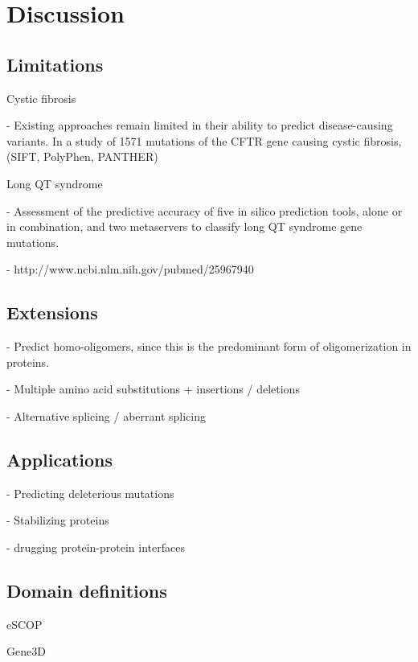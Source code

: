 
\chapter{Discussion}

\section{Limitations}

Cystic fibrosis

  - Existing approaches remain limited in their ability to predict disease-causing variants. In a study of 1571 mutations of the CFTR gene causing cystic fibrosis, (SIFT, PolyPhen, PANTHER) \cite{dorfman_common_2010}


Long QT syndrome

  - Assessment of the predictive accuracy of five in silico prediction tools, alone or in combination, and two metaservers to classify long QT syndrome gene mutations.

  - http://www.ncbi.nlm.nih.gov/pubmed/25967940



\section{Extensions}

- Predict homo-oligomers, since this is the predominant form of oligomerization in proteins.

- Multiple amino acid substitutions + insertions / deletions

- Alternative splicing / aberrant splicing



\section{Applications}

 - Predicting deleterious mutations

 - Stabilizing proteins

 - drugging protein-protein interfaces \cite{wells_reaching_2007}


\section{Domain definitions}

eSCOP

Gene3D

